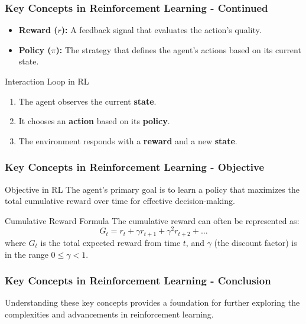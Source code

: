 \documentclass[aspectratio=169]{beamer}
\begin{document}
\begin{frame}[fragile]
    \frametitle{Key Concepts in Reinforcement Learning - Continued}
    \begin{itemize}
        \item \textbf{Reward ($r$):} A feedback signal that evaluates the action's quality.
        \item \textbf{Policy ($\pi$):} The strategy that defines the agent's actions based on its current state.
    \end{itemize}
    \begin{block}{Interaction Loop in RL}
        \begin{enumerate}
            \item The agent observes the current \textbf{state}.
            \item It chooses an \textbf{action} based on its \textbf{policy}.
            \item The environment responds with a \textbf{reward} and a new \textbf{state}.
        \end{enumerate}
    \end{block}
\end{frame}

\begin{frame}[fragile]
    \frametitle{Key Concepts in Reinforcement Learning - Objective}
    \begin{block}{Objective in RL}
        The agent's primary goal is to learn a policy that maximizes the total cumulative reward over time for effective decision-making.
    \end{block}
    \begin{block}{Cumulative Reward Formula}
        The cumulative reward can often be represented as:
        \begin{equation}
            G_t = r_t + \gamma r_{t+1} + \gamma^2 r_{t+2} + \ldots
        \end{equation}
        where $G_t$ is the total expected reward from time $t$, and $\gamma$ (the discount factor) is in the range $0 \leq \gamma < 1$.
    \end{block}
\end{frame}

\begin{frame}[fragile]
    \frametitle{Key Concepts in Reinforcement Learning - Conclusion}
    Understanding these key concepts provides a foundation for further exploring the complexities and advancements in reinforcement learning.
\end{frame}
\end{document}
